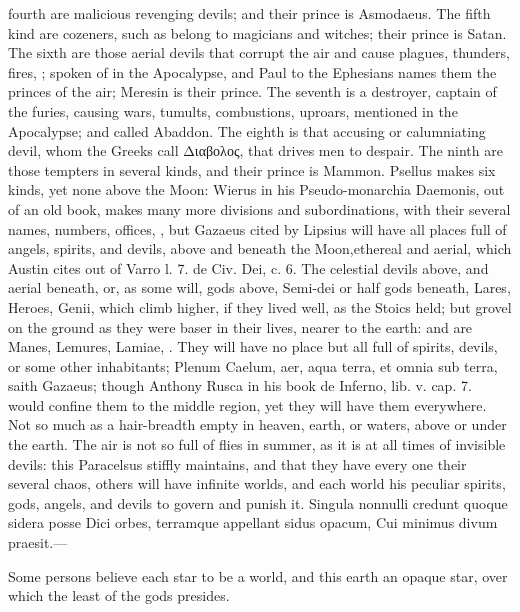 {fourth are malicious revenging devils; and their prince is Asmodaeus.
The fifth kind are cozeners, such as belong to magicians and witches;
their prince is Satan. The sixth are those aerial devils that
corrupt the air and cause plagues, thunders, fires, \etc{}; spoken
of in the Apocalypse, and Paul to the Ephesians names them the princes
of the air; Meresin is their prince. The seventh is a destroyer,
captain of the furies, causing wars, tumults, combustions, uproars,
mentioned in the Apocalypse; and called Abaddon. The eighth is that
accusing or calumniating devil, whom the Greeks call \textgreek{Διαβολος}, that
drives men to despair. The ninth are those tempters in several kinds,
and their prince is Mammon. Psellus makes six kinds, yet none above the
Moon: Wierus in his Pseudo-monarchia Daemonis, out of an old book,
makes many more divisions and subordinations, with their several names,
numbers, offices, \etc{}, but Gazaeus cited by Lipsius will have all
places full of angels, spirits, and devils, above and beneath the
Moon,ethereal and aerial, which Austin cites out of Varro l. 7.
de Civ. Dei, c. 6. The celestial devils above, and aerial beneath, or,
as some will, gods above, Semi-dei or half gods beneath, Lares, Heroes,
Genii, which climb higher, if they lived well, as the Stoics held; but
grovel on the ground as they were baser in their lives, nearer to the
earth: and are Manes, Lemures, Lamiae, \etc{}. They will have no
place but all full of spirits, devils, or some other inhabitants;
Plenum Caelum, aer, aqua terra, et omnia sub terra, saith
Gazaeus; though Anthony Rusca in his book de Inferno, lib. v.
cap. 7. would confine them to the middle region, yet they will have
them everywhere. Not so much as a hair-breadth empty in heaven, earth,
or waters, above or under the earth. The air is not so full of flies in
summer, as it is at all times of invisible devils: this
Paracelsus stiffly maintains, and that they have every one their
several chaos, others will have infinite worlds, and each world his
peculiar spirits, gods, angels, and devils to govern and punish it.
Singula nonnulli credunt quoque sidera posse
Dici orbes, terramque appellant sidus opacum,
Cui minimus divum praesit.---

Some persons believe each star to be a world, and this earth an opaque
star, over which the least of the gods presides.

}
